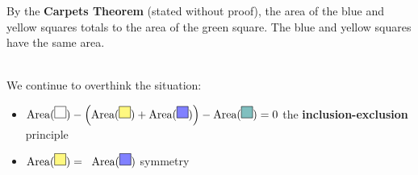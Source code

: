 \documentclass[12pt]{article}
\begin{document}
By the \textbf{Carpets Theorem} (stated without proof), the area of the blue and yellow squares totals to the area of the green square.  The blue and yellow squares have the same area. \\
 \\ 
We continue to overthink the situation:
\begin{itemize}
\item $
\text{Area} (\begin{tikz}\draw(0,0)--(10pt,0)--(10pt,10pt)--(0,10pt)--cycle;\end{tikz} )
- \Big( \text{Area}( \begin{tikz}\draw[fill=yellow!50!white](0,0)--(10pt,0)--(10pt,10pt)--(0,10pt)--cycle;\end{tikz})
+ \text{Area}(\begin{tikz}\draw[fill=blue!50!white](0,0)--(10pt,0)--(10pt,10pt)--(0,10pt)--cycle;\end{tikz}) \Big) - \text{Area}(\begin{tikz}\draw[fill=blue!50!green!50!white](0,0)--(10pt,0)--(10pt,10pt)--(0,10pt)--cycle;\end{tikz})  = 0 $ the \textbf{inclusion-exclusion} principle
\item $
\text{Area}( \begin{tikz}\draw[fill=yellow!50!white](0,0)--(10pt,0)--(10pt,10pt)--(0,10pt)--cycle;\end{tikz})
= \;\;\text{Area}(\begin{tikz}\draw[fill=blue!50!white](0,0)--(10pt,0)--(10pt,10pt)--(0,10pt)--cycle;\end{tikz}) $ \hspace{2.11in} symmetry
\end{itemize}
\end{document}
